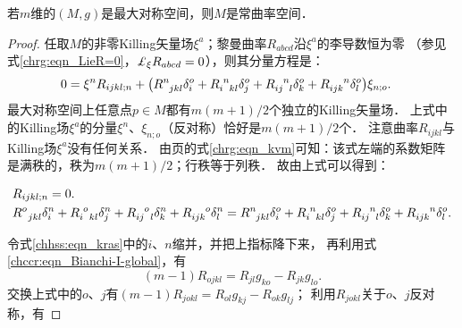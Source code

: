 \begin{proposition}
    若$m$维的$(M,g)$是最大对称空间，则$M$是常曲率空间．
\end{proposition}
\begin{proof}
    任取$M$的非零Killing矢量场$\xi^a$；黎曼曲率$R_{abcd}$沿$\xi^a$的李导数恒为零
    （参见式\eqref{chrg:eqn_LieR=0}，$\Lie_{\xi} R_{abcd} =0$），则其分量方程是：
    \begin{align}
        0&=   \xi^n R_{ijkl;n}
        + \bigl(R^n_{\hphantom{n}jkl} \delta_i^o 
        + R_{i\hphantom{n}kl}^{\hphantom{i}n} \delta_j^o 
        + R_{ij\hphantom{n}l}^{\hphantom{ij}n} \delta_k^o 
        + R_{ijk}^{\hphantom{ijk}n} \delta_l^o 
        \bigr) \xi_{n;o} .
    \end{align}
    最大对称空间上任意点$p\in M$都有$m(m+1)/2$个独立的Killing矢量场．
    上式中的Killing场$\xi^a$的分量$\xi^n$、$\xi_{n;o}$（反对称）恰好是$m(m+1)/2$个．
    注意曲率$R_{ijkl}$与Killing场$\xi^a$没有任何关系．
    由\pageref{chrg:eqn_kvm}页的式\eqref{chrg:eqn_kvm}可知：该式左端的系数矩阵
    是满秩的，秩为$m(m+1)/2$；行秩等于列秩．    故由上式可以得到：
    \begin{small} %
    \begin{align}
        &R_{ijkl;n}=0 .  \label{chhss:eqn_DR=0} \\
        & R^o_{\hphantom{n}jkl} \delta_i^n 
        + R_{i\hphantom{n}kl}^{\hphantom{i}o} \delta_j^n 
        + R_{ij\hphantom{n}l}^{\hphantom{ij}o} \delta_k^n
        + R_{ijk}^{\hphantom{ijk}o} \delta_l^n
        = R^n_{\hphantom{n}jkl} \delta_i^o 
        + R_{i\hphantom{n}kl}^{\hphantom{i}n} \delta_j^o 
        + R_{ij\hphantom{n}l}^{\hphantom{ij}n} \delta_k^o 
        + R_{ijk}^{\hphantom{ijk}n} \delta_l^o . \label{chhss:eqn_kras}
    \end{align} %
    \end{small}
    令式\eqref{chhss:eqn_kras}中的$i$、$n$缩并，并把上指标降下来，
    再利用式\eqref{chccr:eqn_Bianchi-I-global}，有
    \begin{equation}\label{chhss:eqn_Rojkl}
        (m-1)R_{ojkl} = R_{jl} g_{ko}   - R_{jk} g_{lo} .
    \end{equation}
    交换上式中的$o$、$j$有$(m-1)R_{jokl} = R_{ol} g_{kj}   - R_{ok} g_{lj} $；
    利用$R_{jokl}$关于$o$、$j$反对称，有

\end{proof}
